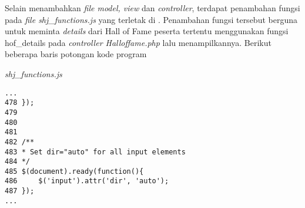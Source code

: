 Selain menambahkan \textit{file model, view} dan \textit{controller}, terdapat penambahan fungsi pada \textit{file shj\_functions.js} yang terletak di . Penambahan fungsi tersebut berguna untuk meminta \textit{details} dari Hall of Fame peserta tertentu menggunakan fungsi hof\_details pada \textit{controller Halloffame.php} lalu menampilkannya.
Berikut beberapa baris potongan kode program

\textit{shj\_functions.js}
\begin{lstlisting}[basicstyle=\ttfamily, frame=single,
columns=fullflexible, keepspaces=true, breaklines=true]
...
478	});
479
480
481
482	/**
483	* Set dir="auto" for all input elements
484	*/
485	$(document).ready(function(){
486		$('input').attr('dir', 'auto');
487	});
...
\end{lstlisting}

